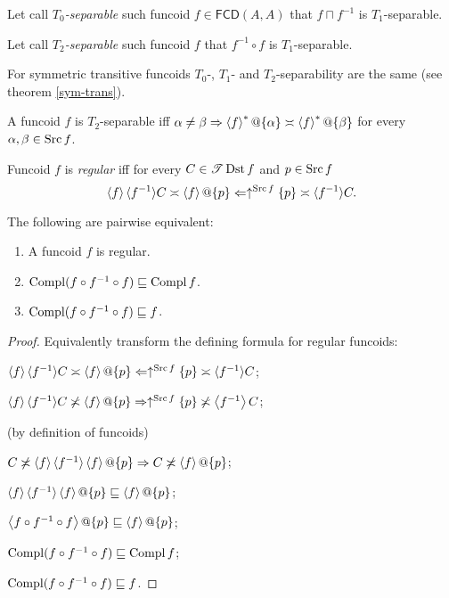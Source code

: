 \begin{defn}
Let call \emph{$T_{0}$-separable} such funcoid $f\in\mathsf{FCD}(A,A)$
that $f\sqcap f^{-1}$ is $T_{1}$-separable.
\end{defn}

\begin{defn}
Let call \emph{$T_{2}$-separable} such funcoid $f$ that $f^{-1}\circ f$
is $T_{1}$-separable.
\end{defn}
For symmetric transitive funcoids $T_{0}$-, $T_{1}$- and $T_{2}$-separability
are the same (see theorem \ref{sym-trans}).
\begin{obvious}
A funcoid $f$ is $T_{2}$-separable iff $\alpha\ne\beta\Rightarrow\left\langle f\right\rangle ^{\ast}@\{\alpha\}\asymp\left\langle f\right\rangle ^{\ast}@\{\beta\}$
for every $\alpha,\beta\in\operatorname{Src} f$.\end{obvious}
\begin{defn}
Funcoid $f$ is \emph{regular} iff for every $C\in\mathscr{T}\operatorname{Dst} f$ and
$p\in\operatorname{Src} f$
\[\left\langle f\right\rangle \langle f^{- 1} \rangle C \asymp \left\langle f\right\rangle
@\{ p \} \Leftarrow \uparrow^{\operatorname{Src} f} \{ p \}
\asymp \langle f^{- 1} \rangle C.\]
\end{defn}

\begin{prop}
The following are pairwise equivalent:
\begin{enumerate}
  \item A funcoid $f$ is regular.
  \item $\operatorname{Compl} (f \circ f^{- 1} \circ f) \sqsubseteq \operatorname{Compl} f$.
  \item $\operatorname{Compl} (f \circ f^{- 1} \circ f) \sqsubseteq f$.
\end{enumerate}
\end{prop}

\begin{proof}
Equivalently transform the defining formula for regular funcoids:

$\left\langle f\right\rangle \langle f^{- 1} \rangle C \asymp \left\langle f\right\rangle
@\{ p \} \Leftarrow \uparrow^{\operatorname{Src} f} \{ p \}
\asymp \langle f^{- 1} \rangle C$;

$\left\langle f\right\rangle \langle f^{- 1} \rangle C \not\asymp \left\langle f\right\rangle
@\{ p \} \Rightarrow \uparrow^{\operatorname{Src} f} \{ p \} \not\asymp \left\langle f^{-1}\right\rangle C$;

(by definition of funcoids)

$C \not\asymp \left\langle f\right\rangle \langle f^{- 1} \rangle \left\langle f\right\rangle
@\{ p \} \Rightarrow C \not\asymp \left\langle f\right\rangle
@\{ p \}$;

$\supfun{f} \langle f^{- 1} \rangle \supfun{f}
@\{ p \} \sqsubseteq \supfun{f}@\{ p \}$;

$\left\langle f \circ f^{- 1} \circ f\right\rangle @\{ p \}
\sqsubseteq \left\langle f\right\rangle @\{ p \}$;

$\operatorname{Compl} (f \circ f^{- 1} \circ f) \sqsubseteq \operatorname{Compl} f$;

$\operatorname{Compl} (f \circ f^{- 1} \circ f) \sqsubseteq f$.
\end{proof}

